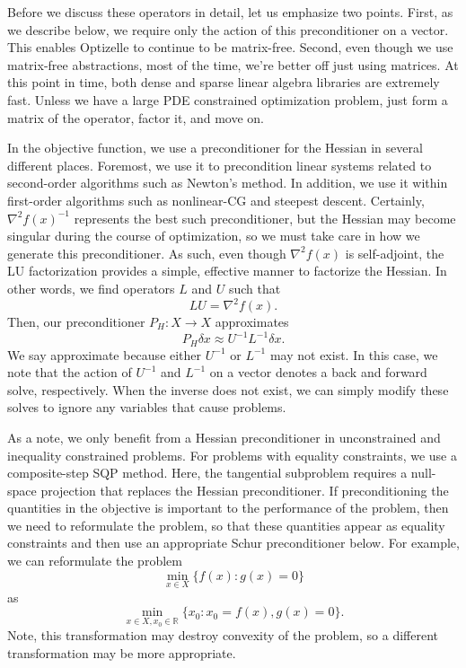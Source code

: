 \documentclass{report}
\newcommand{\re}{\mathbb{R}}
\begin{document}
        Before we discuss these operators in detail, let us emphasize two points.  First, as we describe below, we require only the action of this preconditioner on a vector.  This enables Optizelle to continue to be matrix-free.  Second, even though we use matrix-free abstractions, most of the time, we're better off just using matrices.  At this point in time, both dense and sparse linear algebra libraries are extremely fast.  Unless we have a large PDE constrained optimization problem, just form a matrix of the operator, factor it, and move on.

        In the objective function, we use a preconditioner for the Hessian in several different places.  Foremost, we use it to precondition linear systems related to second-order algorithms such as Newton's method.  In addition, we use it within first-order algorithms such as nonlinear-CG and steepest descent.  Certainly, $\nabla^2 f(x)^{-1}$ represents the best such preconditioner, but the Hessian may become singular during the course of optimization, so we must take care in how we generate this preconditioner.  As such, even though $\nabla^2 f(x)$ is self-adjoint, the LU factorization provides a simple, effective manner to factorize the Hessian.  In other words, we find operators $L$ and $U$ such that
$$
        LU=\nabla^2 f(x).
$$
Then, our preconditioner $P_H:X\rightarrow X$ approximates
$$
        P_H\delta x \approx U^{-1}L^{-1} \delta x.
$$
We say approximate because either $U^{-1}$ or $L^{-1}$ may not exist.  In this case, we note that the action of $U^{-1}$ and $L^{-1}$ on a vector denotes a back and forward solve, respectively.  When the inverse does not exist, we can simply modify these solves to ignore any variables that cause problems.

        As a note, we only benefit from a Hessian preconditioner in unconstrained and inequality constrained problems.  For problems with equality constraints, we use a composite-step SQP method.  Here, the tangential subproblem requires a null-space projection that replaces the Hessian preconditioner.  If preconditioning the quantities in the objective is important to the performance of the problem, then we need to reformulate the problem, so that these quantities appear as equality constraints and then use an appropriate Schur preconditioner below.  For example, we can reformulate the problem
$$
        \min\limits_{x\in X}\{f(x) : g(x) = 0\}
$$
as
$$
        \min\limits_{x\in X,x_0\in \re}\{x_0 : x_0 = f(x), g(x) = 0\}.
$$
Note, this transformation may destroy convexity of the problem, so a different transformation may be more appropriate.
\end{document}
